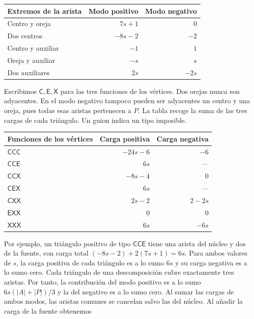 \documentclass[spanish,11pt,a4paper]{article}
\newcounter{none}
\begin{document}
{\def\LTcaptype{none} %
\begin{longtable}[]{@{}lrr@{}}
\toprule\noalign{}
Extremos de la arista & Modo positivo & Modo negativo \\
\midrule\noalign{}
\endhead
\bottomrule\noalign{}
\endlastfoot
Centro y oreja & \(7s+1\) & \(0\) \\
Dos centros & \(-8s-2\) & \(-2\) \\
Centro y auxiliar & \(-1\) & \(1\) \\
Oreja y auxiliar & \(-s\) & \(s\) \\
Dos auxiliares & \(2s\) & \(-2s\) \\
\end{longtable}
}

Escribimos \(\mathsf C,\mathsf E,\mathsf X\) para las tres funciones de los vértices. Dos orejas nunca son adyacentes. En el modo negativo tampoco pueden ser adyacentes un centro y una oreja, pues todas esas aristas pertenecen a \(P\). La tabla recoge la suma de las tres cargas de cada triángulo. Un guion indica un tipo imposible.

{\def\LTcaptype{none} %
\begin{longtable}[]{@{}lrr@{}}
\toprule\noalign{}
Funciones de los vértices & Carga positiva & Carga negativa \\
\midrule\noalign{}
\endhead
\bottomrule\noalign{}
\endlastfoot
\(\mathsf{CCC}\) & \(-24s-6\) & \(-6\) \\
\(\mathsf{CCE}\) & \(6s\) & --- \\
\(\mathsf{CCX}\) & \(-8s-4\) & \(0\) \\
\(\mathsf{CEX}\) & \(6s\) & --- \\
\(\mathsf{CXX}\) & \(2s-2\) & \(2-2s\) \\
\(\mathsf{EXX}\) & \(0\) & \(0\) \\
\(\mathsf{XXX}\) & \(6s\) & \(-6s\) \\
\end{longtable}
}

Por ejemplo, un triángulo positivo de tipo \(\mathsf{CCE}\) tiene una arista del núcleo y dos de la fuente, con carga total \((-8s-2)+2(7s+1)=6s\). Para ambos valores de \(s\), la carga positiva de cada triángulo es a lo sumo \(6s\) y su carga negativa es a lo sumo cero. Cada triángulo de una descomposición cubre exactamente tres aristas. Por tanto, la contribución del modo positivo es a lo sumo \(6s(|A|+|P|)/3\) y la del negativo es a lo sumo cero. Al sumar las cargas de ambos modos, las aristas comunes se cancelan salvo las del núcleo. Al añadir la carga de la fuente obtenemos
\end{document}
